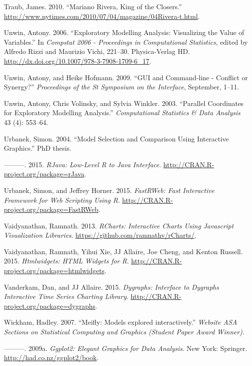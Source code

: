 \documentclass[12pt,]{isuthesis}
\begin{document}
\hypertarget{ref-NYT}{}
Traub, James. 2010. ``Mariano Rivera, King of the Closers.''
\url{http://www.nytimes.com/2010/07/04/magazine/04Rivera-t.html}.

\hypertarget{ref-Unwin:2006}{}
Unwin, Antony. 2006. ``Exploratory Modelling Analysis: Visualizing the
Value of Variables.'' In \emph{Compstat 2006 - Proceedings in
Computational Statistics}, edited by Alfredo Rizzi and Maurizio Vichi,
221--30. Physica-Verlag HD.
\url{http://dx.doi.org/10.1007/978-3-7908-1709-6_17}.

\hypertarget{ref-Unwin:1999vp}{}
Unwin, Antony, and Heike Hofmann. 2009. ``GUI and Command-line -
Conflict or Synergy?'' \emph{Proceedings of the St Symposium on the
Interface}, September, 1--11.

\hypertarget{ref-Unwin:2003uy}{}
Unwin, Antony, Chris Volinsky, and Sylvia Winkler. 2003. ``Parallel
Coordinates for Exploratory Modelling Analysis.'' \emph{Computational
Statistics \& Data Analysis} 43 (4): 553--64.

\hypertarget{ref-Urbanek:2004}{}
Urbanek, Simon. 2004. ``Model Selection and Comparison Using Interactive
Graphics.'' PhD thesis.

\hypertarget{ref-rJava}{}
---------. 2015. \emph{RJava: Low-Level R to Java Interface}.
\url{http://CRAN.R-project.org/package=rJava}.

\hypertarget{ref-FastRWeb}{}
Urbanek, Simon, and Jeffrey Horner. 2015. \emph{FastRWeb: Fast
Interactive Framework for Web Scripting Using R}.
\url{http://CRAN.R-project.org/package=FastRWeb}.

\hypertarget{ref-rCharts}{}
Vaidyanathan, Ramnath. 2013. \emph{RCharts: Interactive Charts Using
Javascript Visualization Libraries}.
\url{https://github.com/ramnathv/rCharts/}.

\hypertarget{ref-htmlwidgets}{}
Vaidyanathan, Ramnath, Yihui Xie, JJ Allaire, Joe Cheng, and Kenton
Russell. 2015. \emph{Htmlwidgets: HTML Widgets for R}.
\url{http://CRAN.R-project.org/package=htmlwidgets}.

\hypertarget{ref-dygraphs}{}
Vanderkam, Dan, and JJ Allaire. 2015. \emph{Dygraphs: Interface to
Dygraphs Interactive Time Series Charting Library}.
\url{http://CRAN.R-project.org/package=dygraphs}.

\hypertarget{ref-Wickham:2007wq}{}
Wickham, Hadley. 2007. ``Meifly: Models explored interactively.''
\emph{Website ASA Sections on Statistical Computing and Graphics
(Student Paper Award Winner)}.

\hypertarget{ref-ggplot2}{}
---------. 2009a. \emph{Ggplot2: Elegant Graphics for Data Analysis}.
New York: Springer. \url{http://had.co.nz/ggplot2/book}.
\end{document}
